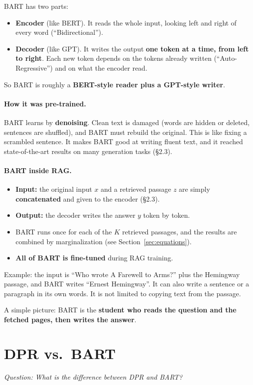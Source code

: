 \documentclass[11pt]{article}
\newcommand{\question}[1]{\noindent\textit{Question: #1}\par\medskip}
\begin{document}
BART has two parts:
\begin{itemize}[nosep]
  \item \textbf{Encoder} (like BERT). It reads the whole input, looking left and right of every word (``Bidirectional'').
  \item \textbf{Decoder} (like GPT). It writes the output \textbf{one token at a time, from left to right}. Each new token depends on the tokens already written (``Auto-Regressive'') and on what the encoder read.
\end{itemize}
So BART is roughly a \textbf{BERT-style reader plus a GPT-style writer}.

\paragraph{How it was pre-trained.}
BART learns by \textbf{denoising}. Clean text is damaged (words are hidden or deleted, sentences are shuffled), and BART must rebuild the original. This is like fixing a scrambled sentence. It makes BART good at writing fluent text, and it reached state-of-the-art results on many generation tasks (\S2.3).

\paragraph{BART inside RAG.}
\begin{itemize}[nosep]
  \item \textbf{Input:} the original input $x$ and a retrieved passage $z$ are simply \textbf{concatenated} and given to the encoder (\S2.3).
  \item \textbf{Output:} the decoder writes the answer $y$ token by token.
  \item BART runs once for each of the $K$ retrieved passages, and the results are combined by marginalization (see Section~\ref{sec:equations}).
  \item \textbf{All of BART is fine-tuned} during RAG training.
\end{itemize}
Example: the input is ``Who wrote A Farewell to Arms?'' plus the Hemingway passage, and BART writes ``Ernest Hemingway''. It can also write a sentence or a paragraph in its own words. It is not limited to copying text from the passage.

A simple picture: BART is the \textbf{student who reads the question and the fetched pages, then writes the answer}.

\section{DPR vs.\ BART}\label{sec:dprbart}
\question{What is the difference between DPR and BART?}
\end{document}
